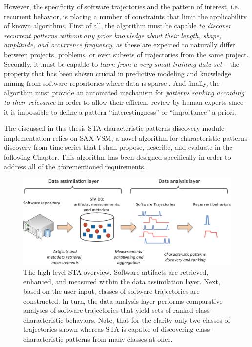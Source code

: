 However, the specificity of software trajectories and the pattern of interest, i.e. recurrent behavior, 
is placing a number of constraints that limit the applicability of known algorithms.
First of all, the algorithm must be capable \textit{to discover recurrent patterns without any prior knowledge 
about their length, shape, amplitude, and occurrence frequency}, as these are expected to naturally differ 
between projects, problems, or even subsets of trajectories from the same project.
Secondly, it must be capable to \textit{learn from a very small training data set} --
the property that has been shown crucial in predictive modeling and knowledge mining from software 
repositories where data is sparse \cite{citeulike:6055293}.
And finally, the algorithm must provide an automated mechanism for 
\textit{patterns ranking according to their relevance} in order to allow their efficient 
review by human experts since it is impossible to define a pattern ``interestingness'' or 
``importance'' a priori.

The discussed in this thesis STA characteristic patterns discovery module implementation relies on SAX-VSM,
a novel algorithm for characteristic patterns discovery from time series that I shall propose, describe, and evaluate 
in the following Chapter. 
This algorithm has been designed specifically in order to address all of the aforementioned requirements.

\begin{figure}[t]
   \centering
   \includegraphics[width=150mm]{figures/Flow-analysis.eps}
   \caption{The high-level STA overview. Software artifacts are retrieved, enhanced, and measured within the
   data assimilation layer. Next, based on the user input, classes of software trajectories are constructed.   
   In turn, the data analysis layer performs comparative analyses of software trajectories that yield sets
   of ranked class-characteristic behaviors.
   Note, that for the clarity only two classes of trajectories shown whereas STA is capable of discovering
   class-characteristic patterns from many classes at once.}
   \label{fig:sta-full-overview}
\end{figure}

